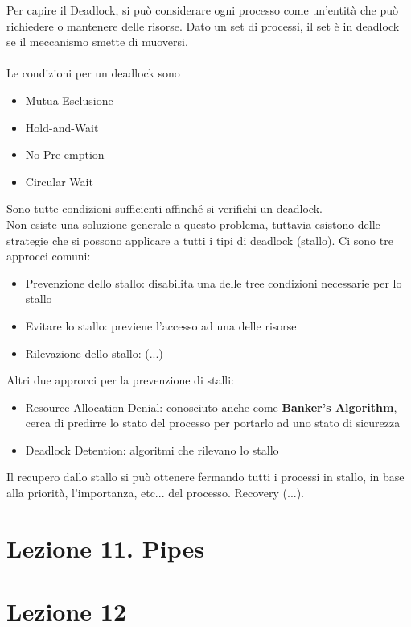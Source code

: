 \documentclass[12pt, a4paper]{article}
\begin{document}
	Per capire il Deadlock, si può considerare ogni processo come un'entità che può richiedere o mantenere delle risorse. Dato un set di processi, il set è in deadlock se il meccanismo smette di muoversi.
	\\ \\
	Le condizioni per un deadlock sono
	\begin{itemize}
		\item Mutua Esclusione
		\item Hold-and-Wait
		\item No Pre-emption
		\item Circular Wait
	\end{itemize}
	Sono tutte condizioni sufficienti affinché si verifichi un deadlock. \\
	Non esiste una soluzione generale a questo problema, tuttavia esistono delle strategie che si possono applicare a tutti i tipi di deadlock (stallo). Ci sono tre approcci comuni:
	\begin{itemize}
		\item Prevenzione dello stallo: disabilita una delle tree condizioni necessarie per lo stallo
		\item Evitare lo stallo: previene l'accesso ad una delle risorse
		\item Rilevazione dello stallo: (...)
	\end{itemize}
	Altri due approcci per la prevenzione di stalli:
	\begin{itemize}
		\item Resource Allocation Denial: conosciuto anche come \textbf{Banker's Algorithm}, cerca di predirre lo stato del processo per portarlo ad uno stato di sicurezza
		\item Deadlock Detention: algoritmi che rilevano lo stallo
	\end{itemize}
	Il recupero dallo stallo si può ottenere fermando tutti i processi in stallo, in base alla priorità, l'importanza, etc... del processo. Recovery (...). 
	
	
	\section*{Lezione 11. Pipes}
	
	\section*{Lezione 12}
	
\end{document}
